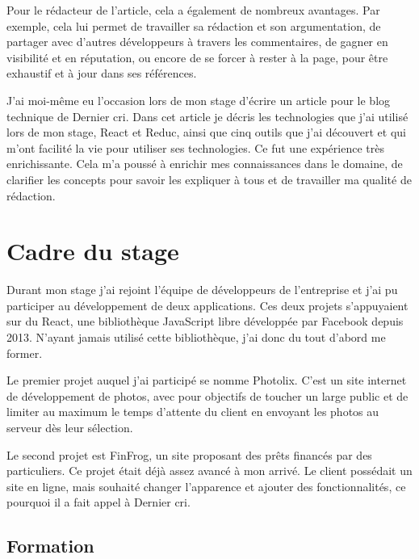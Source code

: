 \bigskip

Pour le rédacteur de l'article, cela a également de nombreux avantages.
Par exemple, cela lui permet de travailler sa rédaction et son
argumentation, de partager avec d'autres développeurs à travers les
commentaires, de gagner en visibilité et en réputation, ou encore de se
forcer à rester à la page, pour être exhaustif et à jour dans ses
références.

\bigskip

J'ai moi-même eu l'occasion lors de mon stage d'écrire un article pour
le blog technique de Dernier cri. Dans cet article je décris les
technologies que j'ai utilisé lors de mon stage, React et Reduc, ainsi
que cinq outils que j'ai découvert et qui m'ont facilité la vie pour
utiliser ses technologies. Ce fut une expérience très enrichissante.
Cela m'a poussé à enrichir mes connaissances dans le domaine, de
clarifier les concepts pour savoir les expliquer à tous et de travailler
ma qualité de rédaction.

\newpage

\section{Cadre du stage}\label{cadre-du-stage}

\bigskip

Durant mon stage j'ai rejoint l'équipe de développeurs de l'entreprise
et j'ai pu participer au développement de deux applications. Ces deux
projets s'appuyaient sur du React, une bibliothèque JavaScript libre
développée par Facebook depuis 2013. N'ayant jamais utilisé cette
bibliothèque, j'ai donc du tout d'abord me former.

\bigskip

Le premier projet auquel j'ai participé se nomme Photolix. C'est un site
internet de développement de photos, avec pour objectifs de toucher un
large public et de limiter au maximum le temps d'attente du client en
envoyant les photos au serveur dès leur sélection.

\bigskip

Le second projet est FinFrog, un site proposant des prêts financés par
des particuliers. Ce projet était déjà assez avancé à mon arrivé. Le
client possédait un site en ligne, mais souhaité changer l'apparence et
ajouter des fonctionnalités, ce pourquoi il a fait appel à Dernier cri.

\bigskip

\subsection{Formation}\label{formation}

